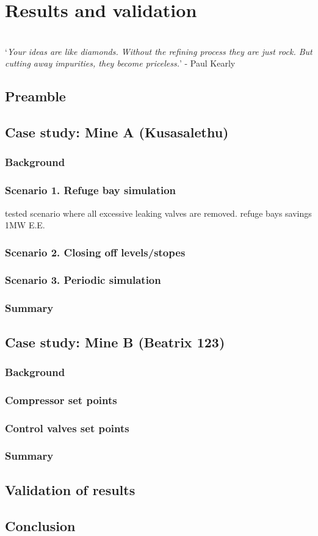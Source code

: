 \chapter{Results and validation}
\vspace{38em}

\hrulefill
\\
\enquote*{\textit{Your ideas are like diamonds. Without the refining process they are just rock. But cutting away impurities, they become priceless.}} - Paul Kearly\\
\newpage
\section{Preamble}
\section{Case study: Mine A \color{blue}(Kusasalethu)}
	\subsection{Background}
	\subsection{Scenario 1. Refuge bay simulation}
	tested scenario where all excessive leaking valves are removed.
	refuge bays savings 1MW E.E.
	\subsection{Scenario 2. Closing off levels/stopes}
	
	\subsection{Scenario 3. Periodic simulation}
	\subsection{Summary}
\section{Case study: Mine B \color{blue}(Beatrix 123)}
	\subsection{Background}
	\subsection{Compressor set points}
	\subsection{Control valves set points}
	\subsection{Summary}
\section{Validation of results}
\section{Conclusion}